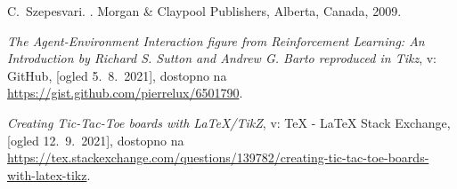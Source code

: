 \documentclass{beamer}    %
\begin{document}
\begin{frame}[t, allowframebreaks]
\begin{thebibliography}{10}
        C.~Szepesvari.
        .
        \newblock Morgan \& Claypool Publishers, Alberta, Canada, 2009.
    
        \emph{The Agent-Environment Interaction figure from Reinforcement Learning: An Introduction by Richard S. Sutton and Andrew G. Barto reproduced in Tikz}, v: GitHub, [ogled 5.~8.~2021], dostopno na \url{https://gist.github.com/pierrelux/6501790}.
    
        \emph{Creating Tic-Tac-Toe boards with LaTeX/TikZ}, v: TeX - LaTeX Stack Exchange, [ogled 12.~9.~2021], dostopno na \url{https://tex.stackexchange.com/questions/139782/creating-tic-tac-toe-boards-with-latex-tikz}.
    
        \end{thebibliography}
\end{frame}
\end{document}
